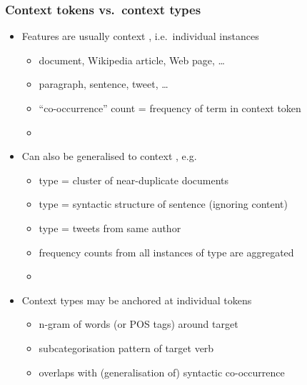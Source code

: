 \documentclass[t]{beamer} %
\begin{document}

\begin{frame}
  \frametitle{Context tokens vs.\ context types}

  \begin{itemize}
  \item Features are usually context , i.e.\ individual instances
    \begin{itemize}
    \item document, Wikipedia article, Web page, \ldots
    \item paragraph, sentence, tweet, \ldots
    \item ``co-occurrence'' count = frequency of term in context token
    \item[]
    \end{itemize}
  \item<2-> Can also be generalised to context , e.g.
    \begin{itemize}
    \item type = cluster of near-duplicate documents
    \item type = syntactic structure of sentence (ignoring content)
    \item type = tweets from same author
    \item frequency counts from all instances of type are aggregated
    \item[]
    \end{itemize}
  \item<3-> Context types may be anchored at individual tokens
    \begin{itemize}
    \item n-gram of words (or POS tags) around target
    \item subcategorisation pattern of target verb
    \item[\So] overlaps with (generalisation of) syntactic co-occurrence
    \end{itemize}
  \end{itemize}

\end{frame}

\end{document}
